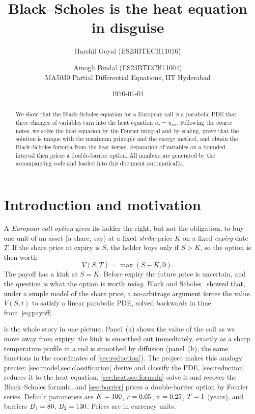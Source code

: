 \documentclass[11pt,a4paper]{article}
\title{Black--Scholes is the heat equation in disguise}
\author{Harshil Goyal (ES23BTECH11016) \and Amogh Bindal (ES23BTECH11004)\\[2pt]
\small MA5030 Partial Differential Equations, IIT Hyderabad}
\date{\today}
\theoremstyle{definition}
\theoremstyle{remark}
\begin{document}
\maketitle

\begin{abstract}
We show that the Black--Scholes equation for a European call is a parabolic
PDE that three changes of variables turn into the heat equation $u_\tau=u_{xx}$.
Following the course notes, we solve the heat equation by the Fourier integral and by
scaling, prove that the solution is unique with the maximum principle and the energy method,
and obtain the Black--Scholes formula from the heat kernel. Separation of variables on a
bounded interval then prices a double-barrier option. All numbers are generated by the
accompanying code and loaded into this document automatically.
\end{abstract}

\section{Introduction and motivation}

A \emph{European call option} gives its holder the right, but not the obligation, to buy one
unit of an asset (a share, say) at a fixed \emph{strike} price $K$ on a fixed \emph{expiry} date $T$.
If the share price at expiry is $S$, the holder buys only if $S>K$, so the option is then worth
\begin{equation}\label{eq:payoff}
  V(S,T)=\max(S-K,0).
\end{equation}
The payoff has a kink at $S=K$. Before expiry the future price is uncertain, and the
question is what the option is worth \emph{today}. Black and Scholes~\cite{blackscholes} showed
that, under a simple model of the share price, a no-arbitrage argument forces the value
$V(S,t)$ to satisfy a linear parabolic PDE, solved backwards in time from~\eqref{eq:payoff}.

 is the whole story in one picture. Panel~(a) shows the
value of the call as we move away from expiry: the kink is smoothed out immediately, exactly as
a sharp temperature profile in a rod is smoothed by diffusion (panel~(b), the same
functions in the coordinates of \cref{sec:reduction}). The project makes this analogy precise:
\cref{sec:model,sec:classification} derive and classify the PDE, \cref{sec:reduction} reduces it to
the heat equation, \cref{sec:heat,sec:formula} solve it and recover the Black--Scholes formula,
and \cref{sec:barrier} prices a double-barrier option by Fourier series.
Default parameters are $K=\num{100}$, $r=\num{0.05}$, $\sigma=\num{0.25}$, $T=\num{1}$ (years), and barriers
$B_1=\num{80}$, $B_2=\num{130}$. Prices are in currency units.
\end{document}

